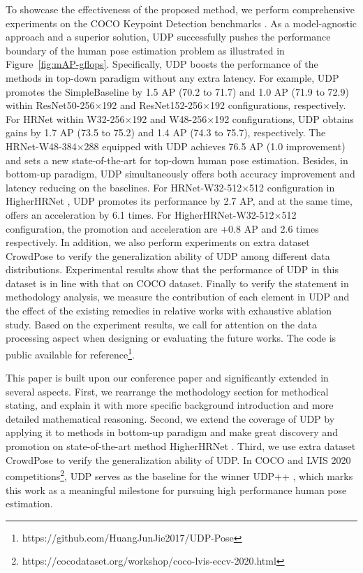 \documentclass[10pt,journal,compsoc]{IEEEtran}
\begin{document}
To showcase the effectiveness of the proposed method, we perform comprehensive experiments on the COCO Keypoint Detection benchmarks \cite{COCO}. As a model-agnostic approach and a superior solution, UDP successfully pushes the performance boundary of the human pose estimation problem as illustrated in Figure~\ref{fig:mAP-gflops}. Specifically, UDP boosts the performance of the methods in top-down paradigm without any extra latency. For example, UDP promotes the SimpleBaseline \cite{SBNet} by 1.5 AP (70.2 to 71.7) and 1.0 AP (71.9 to 72.9) within ResNet50-256$\times$192 and ResNet152-256$\times$192 configurations, respectively. For HRNet \cite{HRNet} within W32-256$\times$192 and W48-256$\times$192 configurations, UDP obtains gains by 1.7 AP (73.5 to 75.2) and 1.4 AP (74.3 to 75.7), respectively. The HRNet-W48-384$\times$288 equipped with UDP achieves 76.5 AP (1.0 improvement) and sets a new state-of-the-art for top-down human pose estimation. Besides, in bottom-up paradigm, UDP simultaneously offers both accuracy improvement and latency reducing on the baselines. For HRNet-W32-512$\times$512 configuration in HigherHRNet \cite{Higher}, UDP promotes its performance by 2.7 AP, and at the same time, offers an acceleration by 6.1 times. For HigherHRNet-W32-512$\times$512 configuration, the promotion and acceleration are +0.8 AP and 2.6 times respectively. In addition, we also perform experiments on extra dataset CrowdPose \cite{Crowdpose} to verify the generalization ability of UDP among different data distributions. Experimental results show that the performance of UDP in this dataset is in line with that on COCO dataset. Finally to verify the statement in methodology analysis, we measure the contribution of each element in UDP and the effect of the existing remedies in relative works with exhaustive ablation study. Based on the experiment results, we call for attention on the data processing aspect when designing or evaluating the future works. The code is public available for reference\footnote{https://github.com/HuangJunJie2017/UDP-Pose}.



This paper is built upon our conference paper \cite{UDP} and significantly extended in several aspects. First, we rearrange the methodology section for methodical stating, and explain it with more specific background introduction and more detailed mathematical reasoning. Second, we extend the coverage of UDP by applying it to methods in bottom-up paradigm and make great discovery and promotion on state-of-the-art method HigherHRNet \cite{Higher}. Third, we use extra dataset CrowdPose \cite{Crowdpose} to verify the generalization ability of UDP. In COCO and LVIS 2020 competitions\footnote{https://cocodataset.org/workshop/coco-lvis-eccv-2020.html}, UDP serves as the baseline for the winner UDP++ \cite{UDP++}, which marks this work as a meaningful milestone for pursuing high performance human pose estimation.
\end{document}
